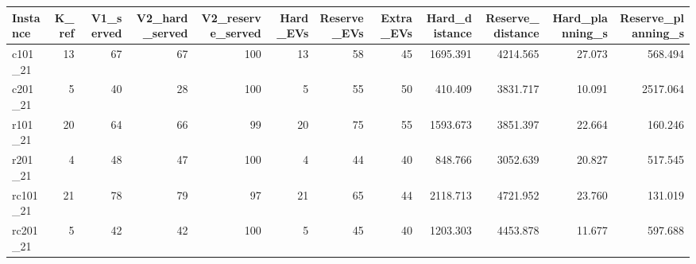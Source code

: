 \begin{tabular}{lrrrrrrrrrrr}
\toprule
Instance & K\_ref & V1\_served & V2\_hard\_served & V2\_reserve\_served & Hard\_EVs & Reserve\_EVs & Extra\_EVs & Hard\_distance & Reserve\_distance & Hard\_planning\_s & Reserve\_planning\_s \\
\midrule
c101\_21 & 13 & 67 & 67 & 100 & 13 & 58 & 45 & 1695.391 & 4214.565 & 27.073 & 568.494 \\
c201\_21 & 5 & 40 & 28 & 100 & 5 & 55 & 50 & 410.409 & 3831.717 & 10.091 & 2517.064 \\
r101\_21 & 20 & 64 & 66 & 99 & 20 & 75 & 55 & 1593.673 & 3851.397 & 22.664 & 160.246 \\
r201\_21 & 4 & 48 & 47 & 100 & 4 & 44 & 40 & 848.766 & 3052.639 & 20.827 & 517.545 \\
rc101\_21 & 21 & 78 & 79 & 97 & 21 & 65 & 44 & 2118.713 & 4721.952 & 23.760 & 131.019 \\
rc201\_21 & 5 & 42 & 42 & 100 & 5 & 45 & 40 & 1203.303 & 4453.878 & 11.677 & 597.688 \\
\bottomrule
\end{tabular}
